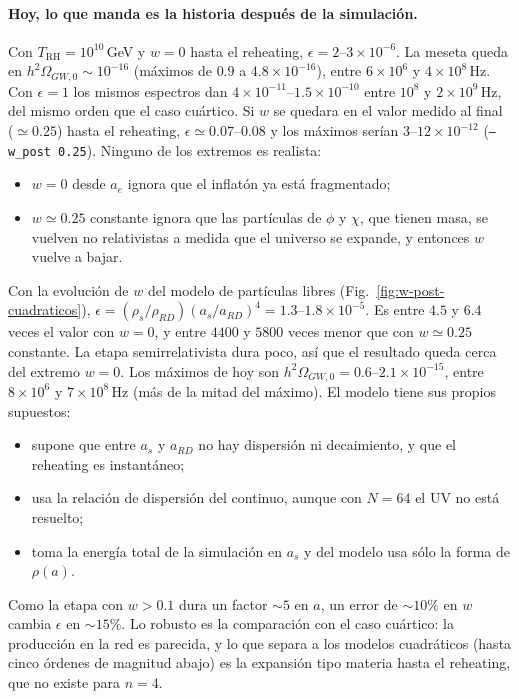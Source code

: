 \documentclass[11pt]{article}
\begin{document}
            \paragraph{Hoy, lo que manda es la historia después de la simulación.} Con $T_{\text{RH}} = 10^{10}$\,GeV y $w = 0$ hasta el reheating, $\epsilon = 2$--$3 \times 10^{-6}$. La meseta queda en $h^2\Omega_{GW,0} \sim 10^{-16}$ (máximos de $0.9$ a $4.8 \times 10^{-16}$), entre $6 \times 10^6$ y $4 \times 10^8$\,Hz. Con $\epsilon = 1$ los mismos espectros dan $4 \times 10^{-11}$--$1.5 \times 10^{-10}$ entre $10^8$ y $2 \times 10^{9}$\,Hz, del mismo orden que el caso cuártico. Si $w$ se quedara en el valor medido al final ($\simeq 0.25$) hasta el reheating, $\epsilon \simeq 0.07$--$0.08$ y los máximos serían $3$--$12 \times 10^{-12}$ (\texttt{--w\_post 0.25}). Ninguno de los extremos es realista:
            \begin{itemize}
                \item $w = 0$ desde $a_e$ ignora que el inflatón ya está fragmentado;
                \item $w \simeq 0.25$ constante ignora que las partículas de $\phi$ y $\chi$, que tienen masa, se vuelven no relativistas a medida que el universo se expande, y entonces $w$ vuelve a bajar.
            \end{itemize}
            Con la evolución de $w$ del modelo de partículas libres (Fig.~\ref{fig:w-post-cuadraticos}), $\epsilon = (\rho_s/\rho_{RD})(a_s/a_{RD})^4 = 1.3$--$1.8 \times 10^{-5}$. Es entre $4.5$ y $6.4$ veces el valor con $w = 0$, y entre $4400$ y $5800$ veces menor que con $w \simeq 0.25$ constante. La etapa semirrelativista dura poco, así que el resultado queda cerca del extremo $w = 0$. Los máximos de hoy son $h^2\Omega_{GW,0} = 0.6$--$2.1 \times 10^{-15}$, entre $8 \times 10^6$ y $7 \times 10^8$\,Hz (más de la mitad del máximo). El modelo tiene sus propios supuestos:
            \begin{itemize}
                \item supone que entre $a_s$ y $a_{RD}$ no hay dispersión ni decaimiento, y que el reheating es instantáneo;
                \item usa la relación de dispersión del continuo, aunque con $N = 64$ el UV no está resuelto;
                \item toma la energía total de la simulación en $a_s$ y del modelo usa sólo la forma de $\rho(a)$.
            \end{itemize}
            Como la etapa con $w > 0.1$ dura un factor $\sim 5$ en $a$, un error de $\sim 10\%$ en $w$ cambia $\epsilon$ en $\sim 15\%$. Lo robusto es la comparación con el caso cuártico: la producción en la red es parecida, y lo que separa a los modelos cuadráticos (hasta cinco órdenes de magnitud abajo) es la expansión tipo materia hasta el reheating, que no existe para $n = 4$.
\end{document}
